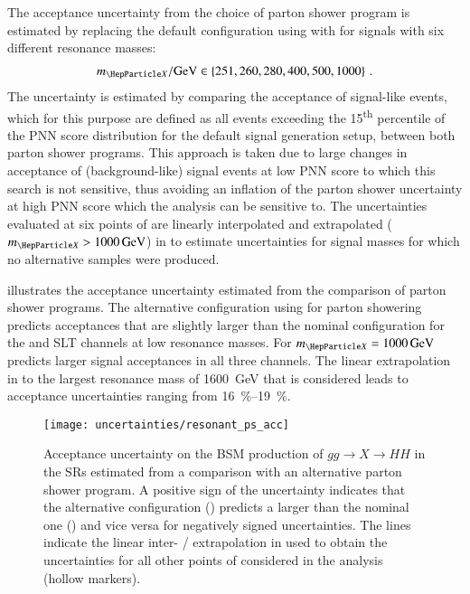 The acceptance uncertainty from the choice of parton shower program is estimated
by replacing the default configuration using \HERWIG[7.1.3] with \PYTHIA[8.235]
for signals with six different resonance masses:
\begin{align*}
  \mX / \si{\GeV} \in \left\{ 251, 260, 280, 400, 500, 1000
  \right\} \,\text{.}
\end{align*}
The uncertainty is estimated by comparing the acceptance of signal-like events,
which for this purpose are defined as all events exceeding the
15\textsuperscript{th} percentile of the PNN score distribution for the default
signal generation setup, between both parton shower programs. This approach is
taken due to large changes in acceptance of (background-like) signal events at
low PNN score to which this search is not sensitive, thus avoiding an inflation
of the parton shower uncertainty at high PNN score which the analysis can be
sensitive to. The uncertainties evaluated at six points of \mX are linearly
interpolated and extrapolated ($\mX > \SI{1000}{\GeV}$) in \mX to estimate
uncertainties for signal masses for which no alternative samples were produced.

 illustrates the acceptance uncertainty
estimated from the comparison of parton shower programs. The alternative
configuration using \PYTHIA for parton showering predicts acceptances that are
slightly larger than the nominal configuration for the \hadhad and \lephad SLT
channels at low resonance masses. For $\mX = \SI{1000}{\GeV}$ \HERWIG predicts
larger signal acceptances in all three channels. The linear extrapolation in \mX
to the largest resonance mass of \SI{1600}{\GeV} that is considered leads to
acceptance uncertainties ranging from \SIrange{16}{19}{\percent}.


%   


\begin{figure}[htbp]
  \centering

  \texttt{[image: uncertainties/resonant\_ps\_acc]}

  \caption{Acceptance uncertainty on the BSM production of $gg \to X \to HH$ in
    the SRs estimated from a comparison with an alternative parton shower
    program. A positive sign of the uncertainty indicates that the alternative
    configuration (\PYTHIA) predicts a larger \AccTimesEff than the nominal one
    (\HERWIG) and vice versa for negatively signed uncertainties. The lines
    indicate the linear inter- / extrapolation in \mX used to obtain the
    uncertainties for all other points of \mX considered in the analysis (hollow
    markers).}
  \label{fig:resonant_partonshower}
\end{figure}

